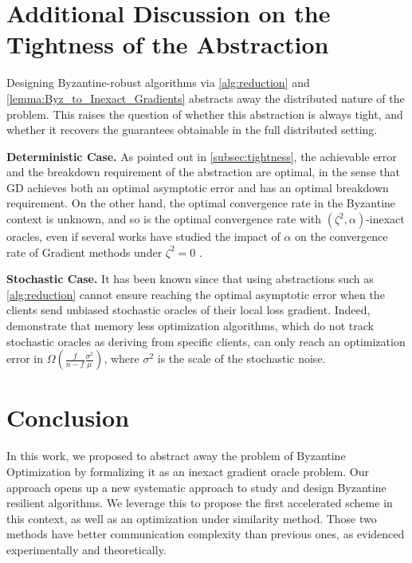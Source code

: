 \documentclass{article}
\theoremstyle{plain}
\theoremstyle{definition}
\theoremstyle{remark}
\begin{document}
\section{Additional Discussion on the Tightness of the Abstraction}




Designing Byzantine-robust algorithms via \cref{alg:reduction} and \cref{lemma:Byz_to_Inexact_Gradients} abstracts away the distributed nature of the problem. This raises the question of whether this abstraction is always tight, and whether it recovers the guarantees obtainable in the full distributed setting.

\textbf{Deterministic Case.} As pointed out in \cref{subsec:tightness}, the achievable error and the breakdown requirement of the abstraction are optimal, in the sense that GD achieves both an optimal asymptotic error and has an optimal breakdown requirement. On the other hand, the optimal convergence rate in the Byzantine context is unknown, and so is the optimal convergence rate with $(\zeta^2,\alpha)$-inexact oracles, even if several works have studied the impact of $\alpha$ on the convergence rate of Gradient methods under $\zeta^2=0$ \citep{de2020worst, gannot2022frequency}. 

\textbf{Stochastic Case.} It has been known since \citet{karimireddy2021learning} that using abstractions such as \cref{alg:reduction} cannot ensure reaching the optimal asymptotic error when the clients send unbiased stochastic oracles of their local loss gradient. Indeed, \citet{karimireddy2021learning} demonstrate that memory less optimization algorithms, which do not track stochastic oracles as deriving from specific clients, can only reach an optimization error in $\Omega(\frac{f}{n-f}\frac{\sigma^2}{\mu})$, where $\sigma^2$ is the scale of the stochastic noise. \\

\section{Conclusion}
In this work, we proposed to abstract away the problem of Byzantine Optimization by formalizing it as an inexact gradient oracle problem. Our approach opens up a new systematic approach to study and design Byzantine resilient algorithms. We leverage this to propose the first accelerated scheme in this context, as well as an optimization under similarity method. Those two methods have better communication complexity than previous ones, as evidenced experimentally and theoretically.
\end{document}
